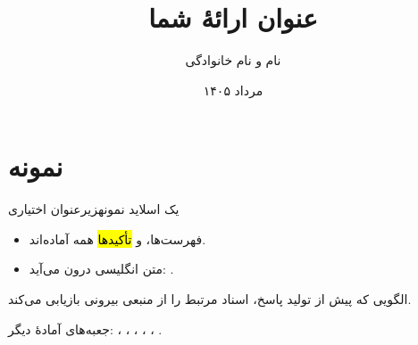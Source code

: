 \documentclass[11pt,aspectratio=169]{beamer}
\title{عنوان ارائهٔ شما}
\author{نام و نام خانوادگی}
\date{مرداد ۱۴۰۵}
\begin{document}
\PTtitleframe

\section{نمونه}

\begin{frame}{یک اسلاید نمونه}{زیرعنوان اختیاری}
  \begin{itemize}
    \item فهرست‌ها،  و \hl{تأکیدها} همه آماده‌اند.
    \item متن انگلیسی درون  می‌آید: .
  \end{itemize}

  \begin{PTdef}[\en{RAG}]
    الگویی که پیش از تولید پاسخ، اسناد مرتبط را از منبعی بیرونی بازیابی می‌کند.
  \end{PTdef}

  \begin{PTnote}
    جعبه‌های آمادهٔ دیگر: ، ، ، ،
    ، .
  \end{PTnote}
\end{frame}

\PTclosingframe
\end{document}
